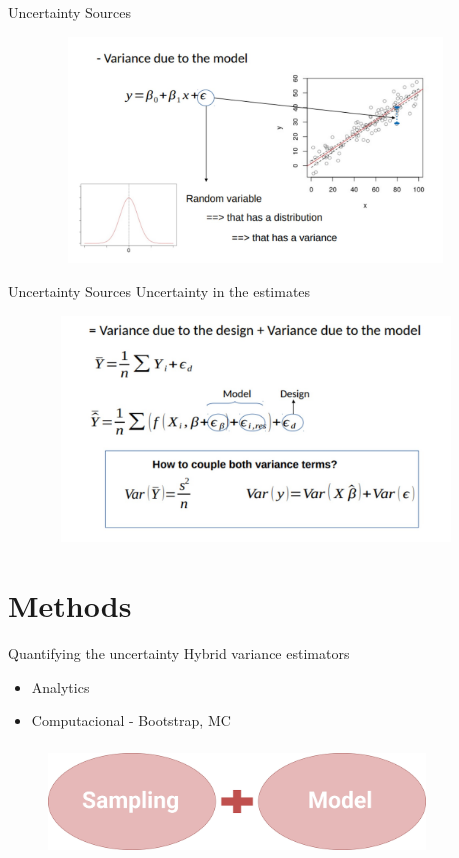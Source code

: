 \documentclass{beamer}
\begin{document}
\begin{frame} {Uncertainty Sources} 
\begin{figure}
        \centering
        \includegraphics[width = 11cm, height = 6cm]{pic/duethemodel.jpg}
        \end{figure} 
\end{frame}

\begin{frame} {Uncertainty Sources} 
Uncertainty in the estimates 
\begin{figure}
        \centering
        \includegraphics[width = 11cm, height = 6cm]{pic/modelinv.jpg}
        \end{figure} 
\end{frame}

\section{Methods}
\begin{frame}{Quantifying the uncertainty}
Hybrid variance estimators
\begin{itemize}
    \item Analytics
    \item Computacional - Bootstrap, MC 
\end{itemize}

\begin{figure}
        \centering
        \includegraphics[width = 10cm, height = 3cm]{pic/fontes.jpg}
        \end{figure}  
    
\end{frame}
\end{document}

